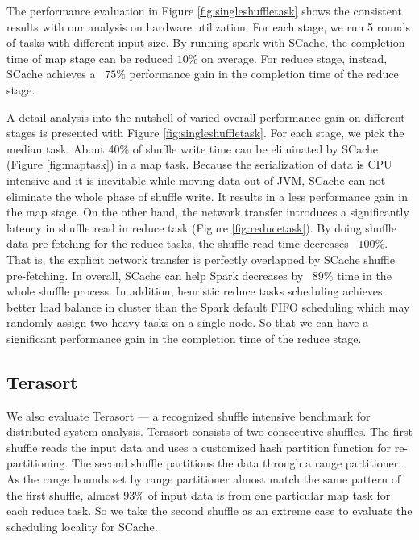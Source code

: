The performance evaluation in Figure \ref{fig:singleshuffletask} shows the consistent results with our analysis on hardware utilization. For each stage, we run 5 rounds of tasks with different input size. By running spark with SCache, the completion time of map stage can be reduced $10\%$ on average. For reduce stage, instead, SCache achieves a ~$75\%$ performance gain in the completion time of the reduce stage.

A detail analysis into the nutshell of varied overall performance gain on different stages is presented with Figure \ref{fig:singleshuffletask}. For each stage, we pick the median task. About 40\% of shuffle write time can be eliminated by SCache (Figure \ref{fig:maptask}) in a map task. Because the serialization of data is CPU intensive \cite{makingsense} and it is inevitable while moving data out of JVM, SCache can not eliminate the whole phase of shuffle write. It results in a less performance gain in the map stage.
On the other hand, the network transfer introduces a significantly latency in shuffle read in reduce task (Figure \ref{fig:reducetask}). By doing shuffle data pre-fetching for the reduce tasks, the shuffle read time decreases ~$100\%$. That is, the explicit network transfer is perfectly overlapped by SCache shuffle pre-fetching. In overall, SCache can help Spark decreases by ~$89\%$ time in the whole shuffle process. In addition, heuristic reduce tasks scheduling achieves better load balance in cluster than the Spark default FIFO scheduling which may randomly assign two heavy tasks on a single node. So that we can have a significant performance gain in the completion time of the reduce stage.

\subsection{Terasort}
We also evaluate Terasort \cite{spark-tera} --- a recognized shuffle intensive benchmark for distributed system analysis.
Terasort consists of two consecutive shuffles. The first shuffle reads the input data and uses a customized hash partition function for re-partitioning. The second shuffle partitions the data through a range partitioner. As the range bounds set by range partitioner almost match the same pattern of the first shuffle, almost $93\%$ of input data is from one particular map task for each reduce task. So we take the second shuffle as an extreme case to evaluate the scheduling locality for SCache.

